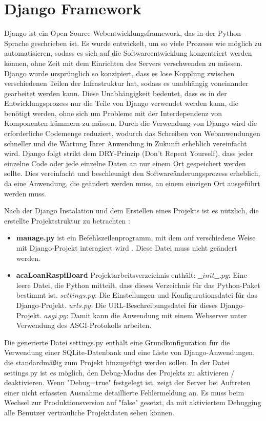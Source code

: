 \section{Django Framework}
\label{sec:theorie:about_django}
Django ist ein Open Source-Webentwicklungsframework, das in der Python-Sprache geschrieben ist. Es wurde entwickelt, um so viele Prozesse wie möglich zu automatisieren, sodass es sich auf die Softwareentwicklung konzentriert werden können, ohne Zeit mit dem Einrichten des Servers verschwenden zu müssen. Django wurde ursprünglich so konzipiert, dass es lose Kopplung zwischen verschiedenen Teilen der Infrastruktur hat, sodass es unabhängig voneinander gearbeitet werden kann. Diese Unabhängigkeit bedeutet, dass es in der Entwicklungsprozess nur die Teile von Django verwendet werden kann, die benötigt werden, ohne sich um Probleme mit der Interdependenz von Komponenten kümmern zu müssen. Durch die Verwendung von Django wird die erforderliche Codemenge reduziert, wodurch das Schreiben von Webanwendungen schneller und die Wartung Ihrer Anwendung in Zukunft erheblich vereinfacht wird. Django folgt strikt dem DRY-Prinzip (Don't Repeat Yourself), dass jeder einzelne Code oder jede einzelne Daten an nur einem Ort gespeichert werden sollte. Dies vereinfacht und beschleunigt den Softwareänderungsprozess erheblich, da eine Anwendung, die geändert werden muss, an einem einzigen Ort ausgeführt werden muss.

Nach der Django Instalation und dem Erstellen eines Projekts ist es nützlich, die erstellte Projektstruktur zu betrachten \cite{website:16}:

\begin{itemize}
	\item \textbf{manage.py} ist ein Befehlszeilenprogramm, mit dem auf verschiedene Weise mit  Django-Projekt interagiert wird . Diese Datei muss nicht geändert werden.
	
	\item \textbf{acaLoanRaspiBoard} Projektarbeitsverzeichnis enthält:
	\subitem \textbf{$\_\_init\_\_.py$}: Eine leere Datei, die Python mitteilt, dass dieses Verzeichnis für das Python-Paket bestimmt ist.
	\subitem \textbf{$settings.py$}: Die Einstellungen und Konfigurationsdatei für das Django-Projekt.
	\subitem \textbf{$urls.py$}: Die URL-Beschreibungsdatei für dieses Django-Projekt.
	\subitem \textbf{$asgi.py$}: Damit kann die Anwendung mit einem Webserver unter Verwendung des ASGI-Protokolls arbeiten.
\end{itemize}
Die generierte Datei settings.py enthält eine Grundkonfiguration für die Verwendung einer SQLite-Datenbank und eine Liste von Django-Anwendungen, die standardmäßig zum Projekt hinzugefügt werden sollen. In der Datei settings.py ist es möglich, den Debug-Modus des Projekts zu aktivieren / deaktivieren. Wenn "Debug=true" festgelegt ist, zeigt der Server  bei Auftreten einer nicht erfassten Ausnahme detaillierte Fehlermeldung an. Es muss beim Wechsel zur Produktionsversion auf "false" gesetzt, da mit aktiviertem Debugging alle Benutzer vertrauliche Projektdaten sehen können. 

